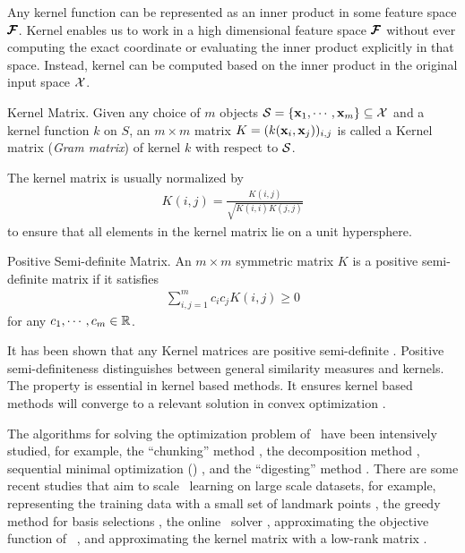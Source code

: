 {Any kernel function can be represented as an inner product in some feature space $\pmb {\mathcal{F}}$.
Kernel enables us to work in a high dimensional feature space $\pmb {\mathcal{F}}$ without ever computing the exact coordinate or evaluating the inner product explicitly in that space.
Instead, kernel can be computed based on the inner product in the original input space $\mathcal{X}$.
\begin{definition}{Kernel Matrix.}
	Given any choice of $m$ objects $\mathcal{S}=\{\mathbf {x}_1,\cdots,\mathbf {x}_m\}\subseteq\mathcal{X}$ and a kernel function $k$ on $S$, an $m\times m$ matrix $K=(k(\mathbf {x}_i,\mathbf {x}_j))_{i,j}$ is called a Kernel matrix (\textit{Gram matrix}) of kernel $k$ with respect to $\mathcal{S}$.
\end{definition}
\noindent
The kernel matrix is usually normalized by
\begin{align*}
	{K}(i,j) = \frac{{K}(i,j)}{\sqrt{{K}(i,i){K}(j,j)}}
\end{align*}
to ensure that all elements in the kernel matrix lie on a unit hypersphere.
\begin{definition}{Positive Semi-definite Matrix.}
	An $m\times m$ symmetric matrix $K$ is a positive semi-definite matrix if it satisfies 
	\begin{align*}
		\sum_{i,j=1}^{m}c_ic_jK(i,j)\ge0
		\end{align*} 
		for any $c_1,\cdots,c_m\in\mathbb{R}$.
\end{definition}
\noindent
It has been shown that any Kernel matrices are positive semi-definite \citep{Taylor04kernel}.
Positive semi-definiteness distinguishes between general similarity measures and kernels.
The property is essential in kernel based methods.
It ensures kernel based methods will converge to a relevant solution in convex optimization \citep{Boyd2004convex}.


The algorithms for solving the optimization problem of \svm\ have been intensively studied, for example, 
the ``chunking'' method \citep{Vapnik82estimation,Perezcruz04double}, 
the decomposition method \citep{Osuna97an,Joachims98making}, 
{sequential minimal optimization} (\smo) \citep{Platt98sequential,Platt99fast}, 
and the ``digesting'' method \citep{Decoste02support}.
There are some recent studies that aim to scale \svm\ learning on large scale datasets, for example, 
representing the training data with a small set of landmark points \citep{Pavlov00towards,Boley04training,Yu05making,Zhang08improved}, 
the greedy method for basis selections \citep{Keerthi06building}, 
the online \svm\ solver \citep{Bordes05fast}, 
approximating the objective function of \svm\ \citep{Zhang12scaling, Le13fast}, 
and approximating the kernel matrix with a low-rank matrix \citep{Smola00sparse,Fine02efficient,Drineas05on,Si14memory}.



}
